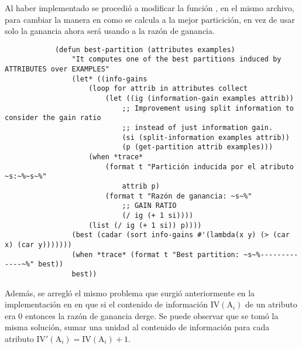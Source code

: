 \begin{itemize}
\begin{solution}
        Al haber implementado  se procedió a modificar la función , en el mismo archivo, para cambiar la manera en como se calcula a la mejor particición, en vez de usar solo la ganancia ahora será usando a la razón de ganancia.
        \begin{verbatim}
            (defun best-partition (attributes examples)
                "It computes one of the best partitions induced by ATTRIBUTES over EXAMPLES"
                (let* ((info-gains 
                    (loop for attrib in attributes collect
                        (let ((ig (information-gain examples attrib))
                            ;; Improvement using split information to consider the gain ratio
                            ;; instead of just information gain.
                            (si (split-information examples attrib))
                            (p (get-partition attrib examples)))
                    (when *trace*
                        (format t "Partición inducida por el atributo ~s:~%~s~%"
                            attrib p)
                        (format t "Razón de ganancia: ~s~%"
                            ;; GAIN RATIO
                            (/ ig (+ 1 si))))
                    (list (/ ig (+ 1 si)) p))))
                (best (cadar (sort info-gains #'(lambda(x y) (> (car x) (car y)))))))
                (when *trace* (format t "Best partition: ~s~%-------------~%" best))
                best))
        \end{verbatim}
        
        Además, se arregló el mismo problema que surgió anteriormente en la implementación en  en que si el contenido de información $\text{IV}(\text{A}_i)$ de un atributo era 0 entonces la razón de ganancia derge. Se puede observar que se tomó la misma solución, sumar una unidad al contenido de información para cada atributo $\text{IV}'(\text{A}_i) = \text{IV}(\text{A}_i) + 1$.


\end{solution}
\end{itemize}
